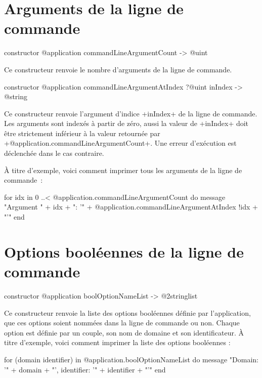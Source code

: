 \section{Arguments de la ligne de commande}



\begin{galgas3box}
constructor @application commandLineArgumentCount -> @uint
\end{galgas3box}

Ce constructeur renvoie le nombre d'arguments de la ligne de commande.



\begin{galgas3box}
constructor @application commandLineArgumentAtIndex ?@uint inIndex
  -> @string
\end{galgas3box}

Ce constructeur renvoie l'argument d'indice \ggst+inIndex+ de la ligne de commande. Les arguments sont indexés à partir de zéro, aussi la valeur de \ggst+inIndex+ doit être strictement inférieur à la valeur retournée par \ggst+@application.commandLineArgumentCount+. Une erreur d'exécution est déclenchée dans le cas contraire.

À titre d'exemple, voici comment imprimer tous les arguments de la ligne de commande~:
\begin{galgas3}
for idx in 0 ..< @application.commandLineArgumentCount do
  message "Argument " + idx + ": '"
    + @application.commandLineArgumentAtIndex {!idx} + "'\n"
end
\end{galgas3}










\section{Options booléennes de la ligne de commande}


\begin{galgas3box}
constructor @application boolOptionNameList -> @2stringlist
\end{galgas3box}

Ce constructeur renvoie la liste des options booléennes définie par l'application, que ces options soient nommées dans la ligne de commande ou non. Chaque option est définie par un couple, son nom de domaine et son identificateur. À titre d'exemple, voici comment imprimer la liste des options booléennes :
\begin{galgas3}
for (domain identifier) in @application.boolOptionNameList do
  message "Domain: '" + domain + "', identifier: '" + identifier + "'\n"
end
\end{galgas3}


